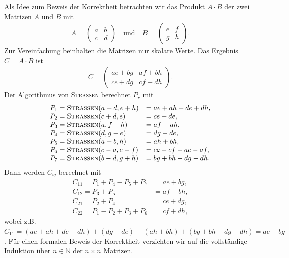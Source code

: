 \documentclass{scrartcl}
\begin{document}
Als Idee zum Beweis der Korrektheit betrachten wir das Produkt $A \cdot B$ der zwei Matrizen $A$ und $B$ mit
\begin{align*}
	A = \begin{pmatrix} a & b \\ c & d \end{pmatrix} \quad \text{und} \quad B = \begin{pmatrix} e & f \\ g & h \end{pmatrix}.
\end{align*}
Zur Vereinfachung beinhalten die Matrizen nur skalare Werte. Das Ergebnis $C = A \cdot B$ ist
\begin{align*}
	C = \begin{pmatrix} ae + bg & af + bh \\ ce + dg & cf + dh \end{pmatrix}.
\end{align*}
Der Algorithmus von \textsc{Strassen} berechnet $P_r$ mit
\[
\begin{array}{ll}
	P_1 = \textsc{Strassen}(a + d, e + h) & = ae + ah + de + dh, \\
	P_2 = \textsc{Strassen}(c + d, e)     & = ce + de, \\
	P_3 = \textsc{Strassen}(a, f - h)     & = af - ah, \\
	P_4 = \textsc{Strassen}(d, g - e)     & = dg - de, \\
	P_5 = \textsc{Strassen}(a + b, h)     & = ah + bh, \\
	P_6 = \textsc{Strassen}(c - a, e + f) & = ce + cf - ae - af, \\
	P_7 = \textsc{Strassen}(b - d, g + h) & = bg + bh - dg - dh.
\end{array}
\]
Dann werden $C_{ij}$ berechnet mit
\[
\begin{array}{ll}
	C_{11} = P_1 + P_4 - P_5 + P_7 & = ae + bg, \\
	C_{12} = P_3 + P_5 & = af + bh, \\
	C_{21} = P_2 + P_4 & = ce + dg, \\
	C_{22} = P_1 - P_2 + P_3 + P_6 & = cf + dh,
\end{array}
\]
wobei z.B. $ C_{11} = (ae + ah + de + dh) + (dg - de) - (ah + bh) + (bg + bh - dg - dh) = ae + bg$. Für einen formalen Beweis der Korrektheit verzichten wir auf die vollständige Induktion über $n \in \mathbb{N}$ der $n \times n$ Matrizen.
\end{document}
